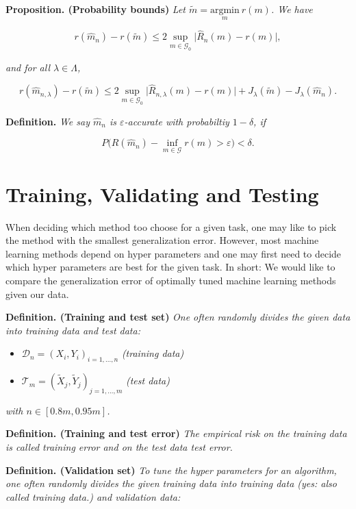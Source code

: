 \documentclass[a4paper,12pt,openany]{book}
\providecommand{\tightlist}{%
 \setlength{\itemsep}{0pt}\setlength{\parskip}{0pt}}
\begin{document}
\textbf{Proposition. (Probability bounds)} \emph{Let \(\tilde{m}=\underset{m}{\text{argmin}}\ r(m)\). We have}

\[
r(\hat{m}_n)-r(\tilde{m})\le 2\sup_{m\in\mathcal{G}_0}\Big\vert\hat{R}_n(m) - r(m) \Big\vert,
\]

\emph{and for all \(\lambda \in \Lambda\),}

\[
r(\hat{m}_{n,\lambda})-r(\tilde{m})\le 2\sup_{m\in\mathcal{G}_0}\Big\vert\hat{R}_{n,\lambda}(m) - r(m) \Big\vert + J_\lambda(\tilde{m})-J_\lambda(\hat{m}_n).
\]

\textbf{Definition.} \emph{We say \(\hat{m}_n\) is \(\varepsilon\)-accurate with probabiltiy \(1-\delta\), if}

\[
P\Big(R(\hat{m}_n)-\inf_{m\in\mathcal{G}}r(m)>\varepsilon\Big)<\delta.
\]

\hypertarget{training-validating-and-testing}{%
\section{Training, Validating and Testing}\label{training-validating-and-testing}}

When deciding which method too choose for a given task, one may like to pick the method with the smallest generalization error. However, most machine learning methods depend on hyper parameters and one may first need to decide which hyper parameters are best for the given task. In short: We would like to compare the generalization error of optimally tuned machine learning methods given our data.

\textbf{Definition. (Training and test set)} \emph{One often randomly divides the given data into training data and test data:}

\begin{itemize}
\tightlist
\item
  \(\mathcal{D}_n=(X_i,Y_i)_{i=1,...,n}\) \emph{(training data)}
\item
  \(\mathcal{T}_m=(\tilde{X}_j,\tilde{Y}_j)_{j=1,...,m}\) \emph{(test data)}
\end{itemize}

\emph{with \(n\in[0.8m,0.95m]\).}

\textbf{Definition. (Training and test error)} \emph{The empirical risk on the training data is called training error and on the test data test error.}

\textbf{Definition. (Validation set)} \emph{To tune the hyper parameters for an algorithm, one often randomly divides the given training data into training data (yes: also called training data.) and validation data:}
\end{document}
